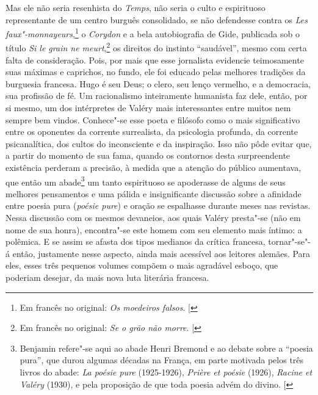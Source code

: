 Mas ele não seria resenhista do \emph{Temps}, não seria o culto e
espirituoso representante de um centro burguês consolidado, se não
defendesse contra os \emph{Les faux"-monnayeurs},\footnote{Em francês no original: \emph{Os moedeiros falsos}. {[}\versal{N. T.}{]}} o \emph{Corydon} e a bela
autobiografia de Gide, publicada sob o título \emph{Si le grain ne meurt},\footnote{Em francês no original: \emph{Se o grão não
morre}. {[}\versal{N. T.}{]}} os direitos do instinto ``saudável'', mesmo com certa falta de
consideração. Pois, por mais que esse jornalista evidencie teimosamente
suas máximas e caprichos, no fundo, ele foi educado pelas melhores
tradições da burguesia francesa. Hugo é seu Deus; o clero, seu lenço
vermelho, e a democracia, sua profissão de fé. Um racionalismo
inteiramente humanista faz dele, então, por si mesmo, um dos intérpretes
de Valéry mais interessantes entre muitos nem sempre bem vindos.
Conhece"-se esse poeta e filósofo como o mais significativo entre os
oponentes da corrente surrealista, da psicologia profunda, da corrente
psicanalítica, dos cultos do inconsciente e da inspiração. Isso não pôde
evitar que, a partir do momento de sua fama, quando os contornos desta
surpreendente existência perderam a precisão, à medida que a atenção do
público aumentava, que então um abade\footnote{Benjamin refere"-se aqui
  ao abade Henri Bremond e ao debate sobre a ``poesia pura'', que durou
  algumas décadas na França, em parte motivada pelos três livros do
  abade: \emph{La poésie pure} (1925-1926), \emph{Prière et poésie}
  (1926), \emph{Racine et Valéry} (1930), e pela proposição de que toda
  poesia advém do divino. {[}\versal{N. E.}{]}} um tanto espirituoso se
apoderasse de alguns de seus melhores pensamentos e uma pálida e
insignificante discussão sobre a afinidade entre poesia pura
(\emph{poésie pure}) e oração se espalhasse durante meses nas revistas.
Nessa discussão com os mesmos devaneios, aos quais Valéry presta"-se (não
em nome de sua honra), encontra"-se este homem com seu elemento mais íntimo: a
polêmica. E se assim se afasta dos tipos medianos da crítica francesa,
tornar"-se"-á então, justamente nesse aspecto, ainda mais acessível aos
leitores alemães. Para eles, esses três pequenos volumes compõem o mais
agradável esboço, que poderiam desejar, da mais nova luta literária
francesa.
